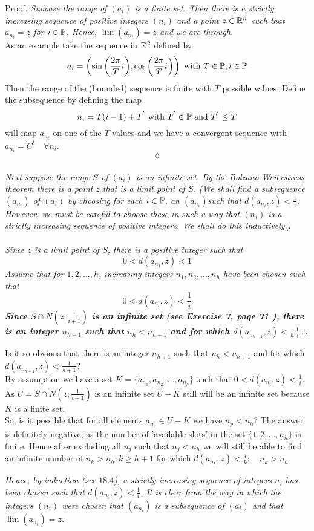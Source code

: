 Proof.
 \textit{Suppose the range of $(a_i)$ is a finite set. Then there is a strictly increasing sequence of positive integers $(n_i)$ and a point $z \in\mathbb{R}^n$ such that $a_{n_i}=z$ for 
$i\in\mathbb{P}$. Hence, $\lim (a_{n_i} ) =z$ and we are through.}
\\
As an example take the sequence in $\mathbb{R}^2$ defined by
$$a_i=\left(\sin{\left(\frac{2\pi}{T}i\right)},\cos{\left(\frac{2\pi}{T}i\right)}\right)\text{ with } T\in \mathbb{P}, i\in \mathbb{P}$$
Then the range of the (bounded) sequence is finite with $T$ possible values. Define the subsequence by defining the map 
$$n_i= T(i-1)+T^{'}\text{ with } T^{'}\in\mathbb{P} \text{ and } T^{'}\leq T$$  will map $a_{n_i}$ on one of the $T$ values and we have a convergent sequence with $a_{n_i}= C^t\quad \forall n_i$.
$$\lozenge$$\\
\textit{Next suppose the range $S$ of
$(a_i)$ is an infinite set. By the Bolzano-Weierstrass theorem there is a point $z$ that is a limit point of $S$. (We shall find a subsequence $(a_{n_i})$ of $(a_i)$ by choosing for each
$i\in \mathbb{P}$, an $(a_{n_i})$such that $d(a_{n_i} , z) < \frac{1}{i}$. However, we must be careful to choose these in such a way that $(n_i)$ is a strictly increasing sequence of positive integers. We shall do this inductively.) \\\\
Since $z$ is a limit point of $S$, there is a positive integer such that}
$$0 < d(a_{n_1}, z) < 1$$
\textit{Assume that for $1,2,\dots, h$, increasing integers ${n_1},{n_2},\dots,{n_h}$ have been chosen
such that}
$$0 < d(a_{n_i}, z) < \frac{1}{i}$$
\textbf{\textit{Since $S\cap N\left(z;\frac{1}{i+1}\right)$ is an infinite set (see Exercise 7, page 71 ), there is an integer $n_{h+1}$ such that $n_{h} < n_{h+1}$ and for which $d(a_{n_{h+1}}, z) < \frac{1}{h+1}$.} }
\begin{mdframed}
Is it so obvious that there is an integer $n_{h+1}$ such that $n_{h} < n_{h+1}$ and for which $d(a_{n_{h+1}}, z) < \frac{1}{h+1}$?\\
By assumption we have a set $K=\{a_{n_1},a_{n_2},\dots,a_{n_h}\}$ such that $0 < d(a_{n_i}, z) < \frac{1}{i}$. As $U= S\cap N\left(z;\frac{1}{i+1}\right)$ is an infinite set $U-K$ still will be an infinite set because $K$ is a finite set.\\
So, is it possible that for all elements $a_{n_p}\in U-K$ we have $n_p<n_h$? The answer is definitely negative, as the number of 'available slots' in the set $\{1,2,\dots,n_h\}$ is finite. Hence after excluding all $n_j$ such that $n_j<n_h$ we will still be able to find an infinite number of $n_k > n_h: k\geq h+1$ for which $d(a_{n_{k}}, z) < \frac{1}{k}:\quad n_k > n_h$
\end{mdframed}
\textit{Hence, by induction (see $18.4$), a strictly increasing sequence of integers $n_{i}$ has been chosen
such that $d(a_{n_{i}}, z) < \frac{1}{i}$. It is clear from the way in which the integers $(n_i)$ were
chosen that $(a_{n_i} )$ is a subsequence of $(a_{i} )$ and that $\lim (a_{n_i}) = z$.}
\newpage
\renewcommand{\thesubsection}{\thesection.\arabic{subsection}}
\setcounter{subsection}{0}

